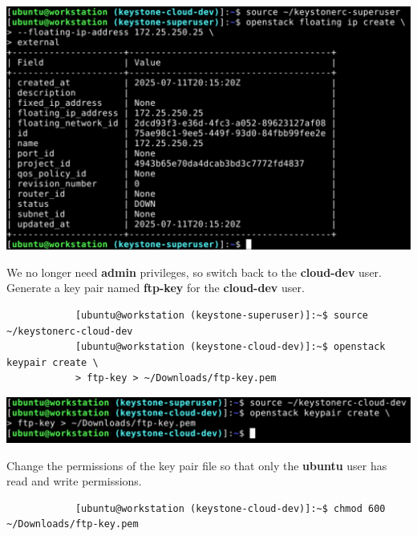 \documentclass[letterpaper, 12pt]{article}
\begin{document}
\begin{enumerate}
\begin{labstep}
        \begin{center}
            \includegraphics[width=\linewidth]{images/part1/step31.png}
        \end{center}
    \end{labstep}

    \begin{labstep}
        We no longer need \textbf{admin} privileges, so switch back to the \textbf{cloud-dev} user.
        Generate a key pair named \textbf{ftp-key} for the \textbf{cloud-dev} user.
        \begin{lstlisting}
            [ubuntu@workstation (keystone-superuser)]:~$ source ~/keystonerc-cloud-dev
            [ubuntu@workstation (keystone-cloud-dev)]:~$ openstack keypair create \
            > ftp-key > ~/Downloads/ftp-key.pem
        \end{lstlisting}

        \begin{center}
            \includegraphics[width=\linewidth]{images/part1/step32.png}
        \end{center}
    \end{labstep}

    \begin{labstep}
        Change the permissions of the key pair file so that only the \textbf{ubuntu} user has read and write permissions.
        \begin{lstlisting}
            [ubuntu@workstation (keystone-cloud-dev)]:~$ chmod 600 ~/Downloads/ftp-key.pem
        \end{lstlisting}


\end{labstep}
\end{enumerate}
\end{document}
